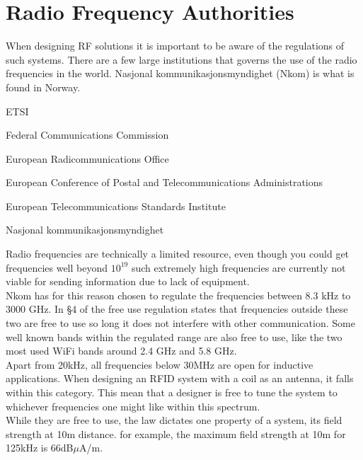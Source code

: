 \newpage
\section{Radio Frequency Authorities}

When designing RF solutions it is important to be aware of the regulations of such systems. There are a few large institutions that governs the use of the radio frequencies in the world. Nasjonal kommunikasjonsmyndighet (Nkom) is what is found in Norway.

\begin{labeling}{ETSI}
\item[FCC] Federal Communications Commission
\item[ERO] European Radicommunications Office
\item[CEPT] European Conference of Postal and Telecommunications Administrations
\item[ETSI] European Telecommunications Standards Institute
\item[Nkom] Nasjonal kommunikasjonsmyndighet
\end{labeling}

Radio frequencies are technically a limited resource, even though you could get frequencies well beyond $10^{19}$ such extremely high frequencies are currently not viable for sending information due to lack of equipment.\\

Nkom has for this reason chosen to regulate the frequencies between 8.3 kHz to 3000 GHz. \cite{Frekvensplan} In §4 of the free use regulation states that frequencies outside these two are free to use so long it does not interfere with other communication. Some well known bands within the regulated range are also free to use, like the two most used WiFi bands around 2.4 GHz and 5.8 GHz.\\

Apart from 20kHz, all frequencies below 30MHz are open for inductive applications. When designing an RFID system with a coil as an antenna, it falls within this category. This mean that a designer is free to tune the system to whichever frequencies one might like within this spectrum.\\

While they are free to use, the law dictates one property of a system, its field strength at 10m distance. for example, the maximum field strength at 10m for 125kHz is 66dB$\mu$A/m.

